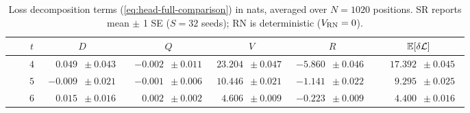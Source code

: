 \newcommand{\hdneg}{\phantom{-}}
\newcommand{\hddig}{\phantom{0}}

\begin{table}[htbp]
  \centering\small
  \caption{Loss decomposition terms (\cref{eq:head-full-comparison}) in nats, averaged over $N=1020$ positions. SR reports mean $\pm$ 1 SE ($S=32$ seeds); RN is deterministic ($V_{\mathrm{RN}}=0$).}
  \label{tab:decomposition}
  {\footnotesize
    \setlength{\tabcolsep}{3pt}
    \begin{tabular}{ccrrrrrr}
      \toprule
                                                                                  &                         & \multicolumn{1}{c}{$t$} & \multicolumn{1}{c}{$D$}                              & \multicolumn{1}{c}{$Q$}
                                                                                  & \multicolumn{1}{c}{$V$} & \multicolumn{1}{c}{$R$} & \multicolumn{1}{c}{$\mathbb{E}[\delta\mathcal L]$}                                                                                                                                                                                                                                             \\
      \midrule
                                                                                  &                         & \cellcolor{gray!10}$4$  & \cellcolor{gray!10}$\hdneg0.049\hddig\pm0.043\hddig$ & \cellcolor{gray!10}${-}0.002\hddig\pm0.011\hddig$    & \cellcolor{gray!10}$23.204\hddig\pm0.047\hddig$      & \cellcolor{gray!10}${-}5.860\hddig\pm0.046\hddig$    & \cellcolor{gray!10}$\hdneg17.392\hddig\pm0.045\hddig$      \\
                                                                                  &                         & \cellcolor{gray!10}$5$  & \cellcolor{gray!10}${-}0.009\hddig\pm0.021\hddig$    & \cellcolor{gray!10}${-}0.001\hddig\pm0.006\hddig$    & \cellcolor{gray!10}$10.446\hddig\pm0.021\hddig$      & \cellcolor{gray!10}${-}1.141\hddig\pm0.022\hddig$    & \cellcolor{gray!10}$\hdneg\hddig9.295\hddig\pm0.025\hddig$ \\
                                                                                  &                         & \cellcolor{gray!10}$6$  & \cellcolor{gray!10}$\hdneg0.015\hddig\pm0.016\hddig$ & \cellcolor{gray!10}$\hdneg0.002\hddig\pm0.002\hddig$ & \cellcolor{gray!10}$\hddig4.606\hddig\pm0.009\hddig$ & \cellcolor{gray!10}${-}0.223\hddig\pm0.009\hddig$    & \cellcolor{gray!10}$\hdneg\hddig4.400\hddig\pm0.016\hddig$ \\

\end{tabular}}
\end{table}
